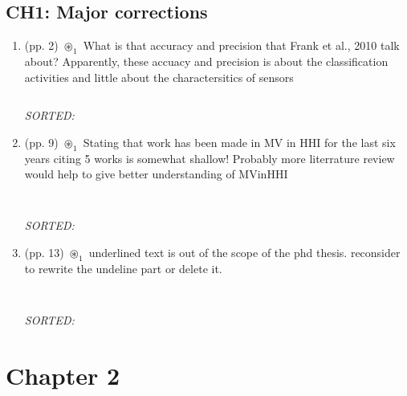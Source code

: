 \documentclass[12pt]{article}
\begin{document}
\subsection{CH1: Major corrections}
\begin{enumerate}
\item  (pp. 2)  $\circledast_1$ 
	What is that accuracy and precision 
	that Frank et al., 2010 talk about?
	Apparently, these accuacy and precision is about
	 the classification activities 
	and little about the charactersitics of sensors
 	\begin{verbatim}	
	\end{verbatim}
	\textit{
	SORTED:  
	}
	\\

\item (pp. 9) 	$\circledast_1$
	Stating that work has been
	made in MV in HHI for the last six years
	citing 5 works is somewhat shallow!
	Probably more literrature review would help
	to give better understanding of MVinHHI 
	\begin{verbatim}
	
	\end{verbatim}
	\textit{
	SORTED:  
	}
	\\


\item  (pp. 13) $\circledast_1$ 
	underlined text is out of the scope of the phd 
	thesis. reconsider to rewrite the undeline part
	or delete it.	
	\begin{verbatim}
	
	\end{verbatim}
	\textit{
	SORTED:  
	}
	\\


	
\end{enumerate}









\section{Chapter 2}
\end{document}
